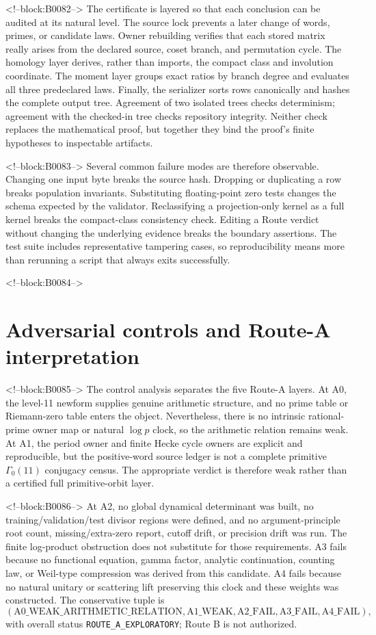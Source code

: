 \documentclass[11pt]{article}
\theoremstyle{definition}
\theoremstyle{remark}
\newcommand{\G}{\Gamma_0(11)}
\begin{document}
<!--block:B0082-->
The certificate is layered so that each conclusion can be audited at its natural level. The source lock prevents a later change of words, primes, or candidate laws. Owner rebuilding verifies that each stored matrix really arises from the declared source, coset branch, and permutation cycle. The homology layer derives, rather than imports, the compact class and involution coordinate. The moment layer groups exact ratios by branch degree and evaluates all three predeclared laws. Finally, the serializer sorts rows canonically and hashes the complete output tree. Agreement of two isolated trees checks determinism; agreement with the checked-in tree checks repository integrity. Neither check replaces the mathematical proof, but together they bind the proof's finite hypotheses to inspectable artifacts.

<!--block:B0083-->
Several common failure modes are therefore observable. Changing one input byte breaks the source hash. Dropping or duplicating a row breaks population invariants. Substituting floating-point zero tests changes the schema expected by the validator. Reclassifying a projection-only kernel as a full kernel breaks the compact-class consistency check. Editing a Route verdict without changing the underlying evidence breaks the boundary assertions. The test suite includes representative tampering cases, so reproducibility means more than rerunning a script that always exits successfully.

<!--block:B0084-->
\section{Adversarial controls and Route-A interpretation}

<!--block:B0085-->
The control analysis separates the five Route-A layers. At A0, the level-11 newform supplies genuine arithmetic structure, and no prime table or Riemann-zero table enters the object. Nevertheless, there is no intrinsic rational-prime owner map or natural $\log p$ clock, so the arithmetic relation remains weak. At A1, the period owner and finite Hecke cycle owners are explicit and reproducible, but the positive-word source ledger is not a complete primitive $\G$ conjugacy census. The appropriate verdict is therefore weak rather than a certified full primitive-orbit layer.

<!--block:B0086-->
At A2, no global dynamical determinant was built, no training/validation/test divisor regions were defined, and no argument-principle root count, missing/extra-zero report, cutoff drift, or precision drift was run. The finite log-product obstruction does not substitute for those requirements. A3 fails because no functional equation, gamma factor, analytic continuation, counting law, or Weil-type compression was derived from this candidate. A4 fails because no natural unitary or scattering lift preserving this clock and these weights was constructed. The conservative tuple is
\[
(\mathrm{A0\_WEAK\_ARITHMETIC\_RELATION},
\mathrm{A1\_WEAK},\mathrm{A2\_FAIL},\mathrm{A3\_FAIL},\mathrm{A4\_FAIL}),
\]
with overall status \texttt{ROUTE\_A\_EXPLORATORY}; Route B is not authorized.
\end{document}
